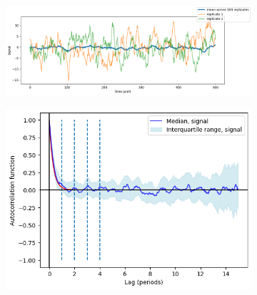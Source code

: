 \begin{figure}
  \centering
  \begin{subfigure}[t]{0.6\textwidth}
  \centering
    \includegraphics[width=\linewidth]{gillespie_k25_d0p05_mean.png}
    \caption{
    }
    \label{fig:acf-noiseamplitude-highk0-ts}
  \end{subfigure}%
  \begin{subfigure}[t]{0.4\textwidth}
  \centering
    \includegraphics[width=\linewidth]{gillespie_k25_d0p05_acf.png}
    \caption{
    }
    \label{fig:acf-noiseamplitude-highk0-acf}
  \end{subfigure}


\end{figure}
